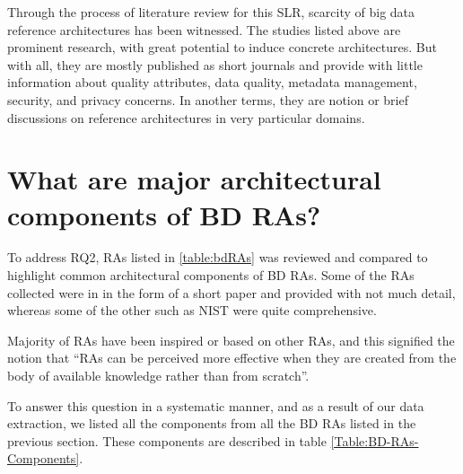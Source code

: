 \documentclass{ieeeaccess}
\begin{document}
Through the process of literature review for this SLR, scarcity of big data reference architectures has been witnessed. The studies listed above are prominent research, with great potential to induce concrete architectures. But with all, they are mostly published as short journals and provide with little information about quality attributes, data quality, metadata management, security, and privacy concerns. In another terms, they are notion or brief discussions on reference architectures in very particular domains.

\section{What are major architectural components of BD RAs? }

To address RQ2, RAs listed in \ref{table:bdRAs} was reviewed and compared to highlight common architectural components of BD RAs. Some of the RAs collected were in in the form of a short paper and provided with not much detail, whereas some of the other such as NIST were quite comprehensive. 

Majority of RAs have been inspired or based on other RAs, and this signified the notion that “RAs can be perceived more effective when they are created from the body of available knowledge rather than from scratch”.

To answer this question in a systematic manner, and as a result of our data extraction, we listed all the components from all the BD RAs listed in the previous section. These components are described in table \ref{Table:BD-RAs-Components}.
\end{document}
